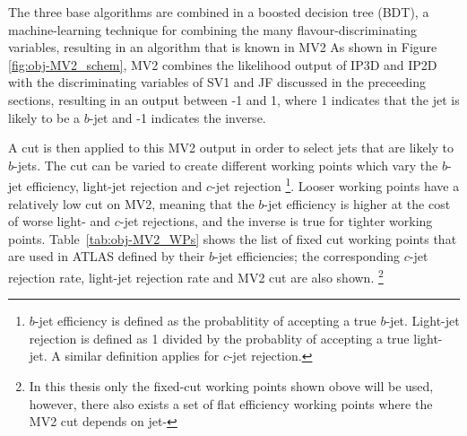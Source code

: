    The three base algorithms are combined in a boosted decision tree (BDT), a machine-learning technique for combining the many flavour-discriminating variables,
   resulting in an algorithm that is known in MV2
   As shown in Figure \ref{fig:obj-MV2_schem}, MV2 combines the likelihood output of IP3D and IP2D
   with the discriminating variables of SV1 and JF discussed in the preceeding sections,
   resulting in an output between -1 and 1, where 1 indicates that the jet is likely to be a $b$-jet and -1 indicates the inverse.

   A cut is then applied to this MV2 output in order to select jets that are likely to $b$-jets.
   The cut can be varied to create different working points which vary the $b$-jet efficiency, light-jet rejection and $c$-jet rejection
   \footnote{$b$-jet efficiency is defined as the probablitity of accepting a true $b$-jet.
     Light-jet rejection is defined as 1 divided by the probablity of accepting a true light-jet.
     A similar definition applies for $c$-jet rejection.}.
   Looser working points have a relatively low cut on MV2, meaning that the $b$-jet efficiency is higher at the cost of worse light- and $c$-jet rejections,
   and the inverse is true for tighter working points.
   Table~\ref{tab:obj-MV2_WPs} shows the list of fixed cut working points that are used in ATLAS defined by their $b$-jet efficiencies;
   the corresponding $c$-jet rejection rate, light-jet rejection rate and MV2 cut are also shown.
   \footnote{In this thesis only the fixed-cut working points shown obove will be used,
     however, there also exists a set of flat efficiency working points where the MV2 cut depends on jet-\pT}

